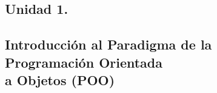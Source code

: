 \documentclass[letterpaper, 12pt]{article}
\begin{document}
    \newpage
        \tableofcontents

    \newpage
        \justify
        \begin{huge}
            \bigbreak
            \bigbreak
            \bigbreak
            \section*{\huge{Unidad 1.}}
            \subsection*{\huge{Introducción al Paradigma de la \\Programación Orientada \\a Objetos (POO)}}
        \end{huge}
    
\end{document}
